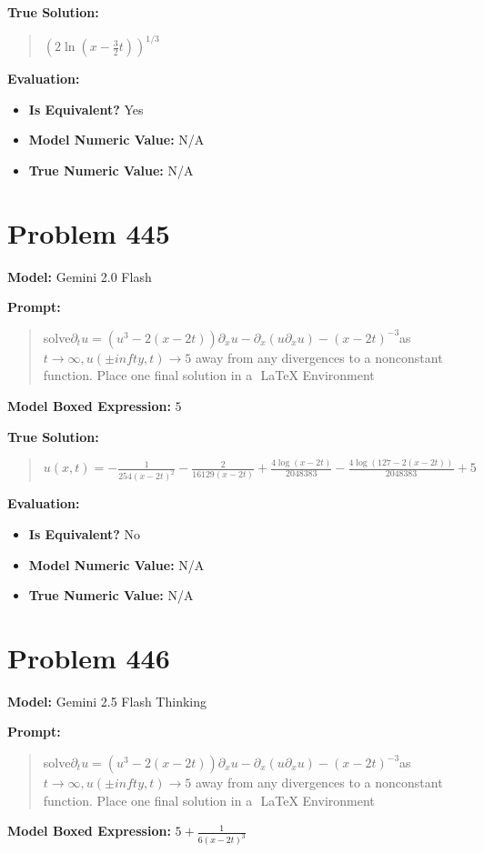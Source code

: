 \documentclass{article}
\begin{document}
\textbf{True Solution:}
\begin{quote}
$\left(2\ln\left(x-\frac{3}{2}t\right)\right)^{1/3}$
\end{quote}

\textbf{Evaluation:}
\begin{itemize}
\item \textbf{Is Equivalent?} Yes
\item \textbf{Model Numeric Value:} N/A
\item \textbf{True Numeric Value:} N/A
\end{itemize}
\vspace{1cm}
\section*{Problem 445}
\textbf{Model:} Gemini 2.0 Flash

\textbf{Prompt:}
\begin{quote}
solve$ \partial_t u = (u^3-2(x-2t)) \partial_x u - \partial_x \left( u \partial_x u \right) - (x-2t)^{-3} $as $t\to\infty, u(\pm infty,t)\to 5$ away from any divergences to a nonconstant function. Place one final solution in a $\boxed{}$ LaTeX Environment
\end{quote}
\textbf{Model Boxed Expression:} $5$

\textbf{True Solution:}
\begin{quote}
$u(x,t)=-\frac{1}{254 (x-2t)^2}-\frac{2}{16129 (x-2t)}+\frac{4 \log (x-2t)}{2048383}-\frac{4 \log (127-2 (x-2t))}{2048383}+5$
\end{quote}

\textbf{Evaluation:}
\begin{itemize}
\item \textbf{Is Equivalent?} No
\item \textbf{Model Numeric Value:} N/A
\item \textbf{True Numeric Value:} N/A
\end{itemize}
\vspace{1cm}
\section*{Problem 446}
\textbf{Model:} Gemini 2.5 Flash Thinking

\textbf{Prompt:}
\begin{quote}
solve$ \partial_t u = (u^3-2(x-2t)) \partial_x u - \partial_x \left( u \partial_x u \right) - (x-2t)^{-3} $as $t\to\infty, u(\pm infty,t)\to 5$ away from any divergences to a nonconstant function. Place one final solution in a $\boxed{}$ LaTeX Environment
\end{quote}
\textbf{Model Boxed Expression:} $5 + \frac{1}{6(x-2t)^3}$
\end{document}
